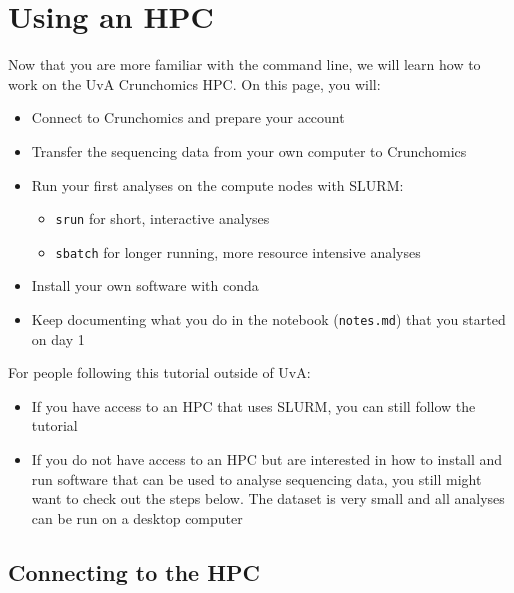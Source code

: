 \documentclass[
  letterpaper,
  DIV=11,
  numbers=noendperiod]{scrreprt}
\author{}
\date{}
\providecommand{\tightlist}{%
  \setlength{\itemsep}{0pt}\setlength{\parskip}{0pt}}
\renewcommand*\contentsname{Table of contents}
\newcommand\contentsname{Table of contents}
\begin{document}

\renewcommand*\contentsname{Table of contents}
{
\hypersetup{linkcolor=}
\setcounter{tocdepth}{2}
\tableofcontents
}

\chapter{Using an HPC}\label{using-an-hpc}

Now that you are more familiar with the command line, we will learn how
to work on the UvA Crunchomics HPC. On this page, you will:

\begin{itemize}
\tightlist
\item
  Connect to Crunchomics and prepare your account
\item
  Transfer the sequencing data from your own computer to Crunchomics
\item
  Run your first analyses on the compute nodes with SLURM:

  \begin{itemize}
  \tightlist
  \item
    \texttt{srun} for short, interactive analyses
  \item
    \texttt{sbatch} for longer running, more resource intensive analyses
  \end{itemize}
\item
  Install your own software with conda
\item
  Keep documenting what you do in the notebook (\texttt{notes.md}) that
  you started on day 1
\end{itemize}

For people following this tutorial outside of UvA:

\begin{itemize}
\tightlist
\item
  If you have access to an HPC that uses SLURM, you can still follow the
  tutorial
\item
  If you do not have access to an HPC but are interested in how to
  install and run software that can be used to analyse sequencing data,
  you still might want to check out the steps below. The dataset is very
  small and all analyses can be run on a desktop computer
\end{itemize}

\section{Connecting to the HPC}\label{connecting-to-the-hpc}
\end{document}
